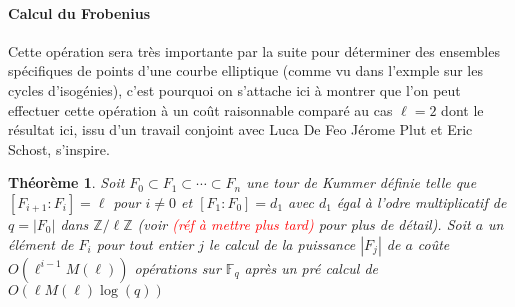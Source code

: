 \documentclass[10pt,a4paper]{book}
\theoremstyle{plain}
\newtheorem{thm}{Théorème}
\theoremstyle{definition}
\theoremstyle{definition}
\theoremstyle{definition}
\theoremstyle{definition}
\theoremstyle{remark}
\theoremstyle{remark}
\begin{document}
\paragraph{Calcul du Frobenius}
Cette opération sera très importante par la suite pour déterminer des ensembles spécifiques de points d'une courbe elliptique (comme vu dans l'exmple sur les cycles d'isogénies), c'est pourquoi on s'attache ici à montrer que l'on peut effectuer cette opération à un coût raisonnable comparé au cas $\ell=2$ \cite{Doliskani-Schost15} dont le résultat ici, issu d'un travail conjoint avec Luca De Feo Jérome Plut et Eric Schost, s'inspire.

\begin{thm} \label{thm:frob-ell}
Soit $F_0 \subset F_1 \subset \cdots \subset F_n$ une tour de Kummer définie telle que $[F_{i+1}:F_i]=\ell$ pour $i \neq 0$ et $[F_1:F_0]=d_1$ avec $d_1$ égal à l'odre multiplicatif de $q=|F_0|$  dans $\mathbb{Z}/\ell \mathbb{Z}$ (voir \textcolor{red}{(réf à mettre plus tard)} pour plus de détail). Soit $a$ un élément de $F_i$ pour tout entier $j$ le calcul de la puissance $|F_j|$ de $a$ coûte $O(\ell^{i-1}M(\ell))$ opérations sur $\mathbb{F}_q$ après un pré calcul de $O(\ell M(\ell)\log(q))$
\end{thm} 
\end{document}
